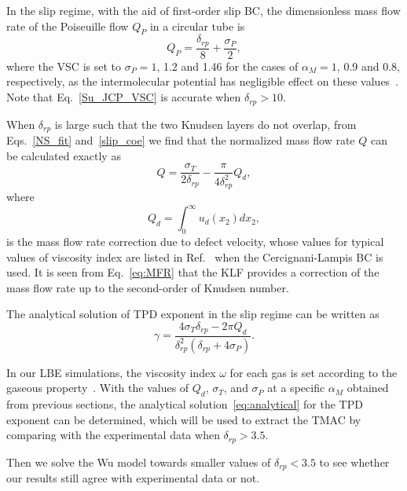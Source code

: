 In the slip regime, with the aid of first-order slip BC, the dimensionless mass flow rate of the Poiseuille flow $Q_P$ in a circular tube is~\citep{sharipov2015rarefied}
\begin{equation}\label{Su_JCP_VSC}
Q_P=\frac{\delta_{rp}}{8}+\frac{\sigma_P}{2},
\end{equation}
where the VSC is set to $\sigma_P=1$, 1.2 and 1.46 for the cases of $\alpha_M=1$, 0.9 and 0.8, respectively, as the intermolecular potential has negligible effect on these values~\citep{SU2019573}. Note that Eq.~\eqref{Su_JCP_VSC} is accurate when $\delta_{rp}>10$. 


When $\delta_{rp}$ is large such that the two Knudsen layers do not overlap, from Eqs.~\eqref{NS_fit} and~\eqref{slip_coe} we find that the normalized mass flow rate $Q$ can be calculated exactly as
\begin{equation}\label{eq:MFR}
Q=\frac{\sigma_T}{2\delta_{rp}}-\frac{\pi}{4\delta_{rp}^2}Q_d,
\end{equation}
where 
\begin{equation}
Q_d=\int_0^\infty{}u_d(x_2)d x_2,
\end{equation}
is the mass flow rate correction due to defect velocity, whose values for typical values of viscosity index are listed in Ref.~\cite{Wang2020PoF} when the Cercignani-Lampis  BC  is used. It is seen from Eq.~\eqref{eq:MFR} that the KLF provides a correction of the mass flow rate up to the second-order of Knudsen number.


The analytical solution of TPD exponent in the slip regime can be written as
\begin{equation}\label{eq:analytical}
\gamma=\frac{4\sigma_T\delta_{rp}-2\pi Q_d}{\delta_{rp}^2(\delta_{rp}+4\sigma_P)}.
\end{equation}



In our LBE simulations, the viscosity index $\omega$ for each gas is set according to the gaseous property~\citep{Bird1994}. With the values of $Q_d$, $\sigma_T$, and $\sigma_P$ at a specific $\alpha_M$ obtained from previous sections, the analytical solution~\eqref{eq:analytical} for the TPD exponent can be determined, which will be used to extract the TMAC by comparing with the experimental data when $\delta_{rp}>3.5$.
 
Then we solve the Wu model towards smaller values of $\delta_{rp}<3.5$ to see whether our results still agree with experimental data or not.



